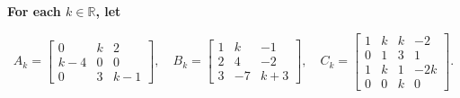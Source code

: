 \providecommand{\rank}{\operatorname{r}}
\providecommand{\RR}{\mathbb R}
\providecommand{\CC}{\mathbb C}
\providecommand{\KK}{\mathbb K}

\setcounter{enumi}{50}
\item {\bfseries\boldmath
For each $k\in\RR$, let
}

\[
A_k=\begin{bmatrix}0&k&2\\k-4&0&0\\0&3&k-1\end{bmatrix},\quad B_k=\begin{bmatrix}1&k&-1\\2&4&-2\\3&-7&k+3\end{bmatrix},\quad C_k=\begin{bmatrix}1&k&k&-2\\0&1&3&1\\1&k&1&-2k\\0&0&k&0\end{bmatrix}.
\]

